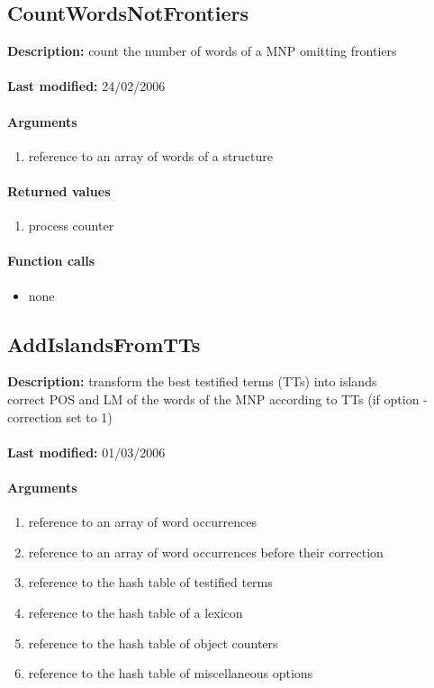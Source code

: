 \subsection{CountWordsNotFrontiers}
\textbf{Description:} count the number of words of a MNP omitting frontiers\\
\\\textbf{Last modified:} 24/02/2006

\paragraph{Arguments}
\begin{enumerate}
\item reference to an array of words of a structure
\end{enumerate}

\paragraph{Returned values}
\begin{enumerate}
\item process counter
\end{enumerate}

\paragraph{Function calls}
\begin{itemize}
\item none
\end{itemize}

\subsection{AddIslandsFromTTs}
\textbf{Description:} transform the best testified terms (TTs) into islands\\
correct POS and LM of the words of the MNP according to TTs (if option -correction set to 1)\\
\\\textbf{Last modified:} 01/03/2006

\paragraph{Arguments}
\begin{enumerate}
\item reference to an array of word occurrences
\item reference to an array of word occurrences before their correction
\item reference to the hash table of testified terms
\item reference to the hash table of a lexicon
\item reference to the hash table of object counters
\item reference to the hash table of miscellaneous options
\end{enumerate}

